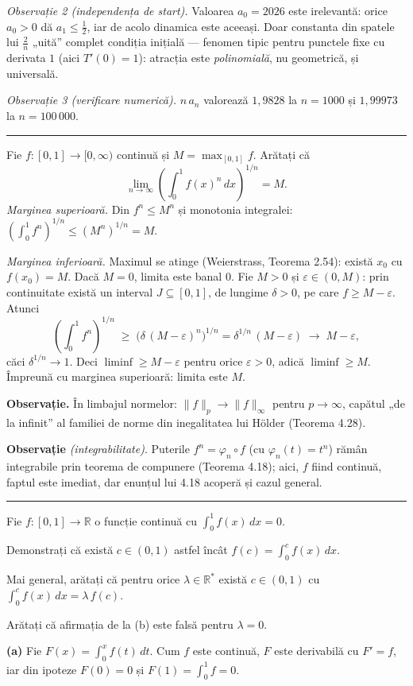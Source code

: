 \emph{Observație 2 (independența de start).} Valoarea $a_{0}=2026$ este irelevantă: orice $a_{0}>0$ dă $a_{1}\le\frac12$, iar de acolo dinamica este aceeași. Doar constanta din spatele lui $\frac2n$ „uită'' complet condiția inițială --- fenomen tipic pentru punctele fixe cu derivata $1$ (aici $T'(0)=1$): atracția este \emph{polinomială}, nu geometrică, și universală.

\emph{Observație 3 (verificare numerică).} $n\,a_{n}$ valorează $1{,}9828$ la $n=1000$ și $1{,}99973$ la $n=100\,000$.
\vspace{1mm}\hrule

Fie $f : [0,1] \to [0,\infty)$ continuă și $M = \max_{[0,1]} f$. Arătați că
\[
\lim_{n\to\infty} \left( \int_0^1 f(x)^n \, dx \right)^{1/n} = M.
\]
\sol \emph{Marginea superioară.} Din $f^n \le M^n$ și monotonia integralei:
$\left(\int_0^1 f^n\right)^{1/n} \le (M^n)^{1/n} = M$.

\emph{Marginea inferioară.} Maximul se atinge (Weierstrass, Teorema 2.54): există
$x_0$ cu $f(x_0) = M$. Dacă $M = 0$, limita este banal $0$. Fie $M > 0$ și
$\varepsilon \in (0, M)$: prin continuitate există un interval $J \subseteq [0,1]$, de lungime $\delta > 0$, pe
care $f \ge M - \varepsilon$. Atunci
\[
\left( \int_0^1 f^n \right)^{1/n} \;\ge\; \bigl( \delta \, (M - \varepsilon)^n \bigr)^{1/n} = \delta^{1/n} \, (M - \varepsilon) \; \longrightarrow \; M - \varepsilon,
\]
căci $\delta^{1/n} \to 1$. Deci $\liminf \ge M - \varepsilon$ pentru orice $\varepsilon > 0$, adică $\liminf \ge M$. Împreună
cu marginea superioară: limita este $M$.

\medskip
\noindent\textbf{Observație.} În limbajul normelor: $\|f\|_p \to \|f\|_\infty$ pentru $p \to \infty$,
capătul „de la infinit'' al familiei de norme din inegalitatea lui H\"older (Teorema 4.28).

\medskip
\noindent\textbf{Observație} \emph{(integrabilitate)}. Puterile $f^n = \varphi_n \circ f$ (cu $\varphi_n(t) = t^n$) rămân
integrabile prin teorema de compunere (Teorema 4.18); aici, $f$ fiind continuă, faptul
este imediat, dar enunțul lui 4.18 acoperă și cazul general.
\vspace{1mm}\hrule

Fie $f:[0,1]\to\mathbb{R}$ o funcție continuă cu $\displaystyle\int_0^1 f(x)\,dx=0$.
\begin{parti}
  \item Demonstrați că există $c\in(0,1)$ astfel încât
        $\displaystyle f(c)=\int_0^c f(x)\,dx$.
  \item Mai general, arătați că pentru orice $\lambda\in\mathbb{R}^{*}$ există
        $c\in(0,1)$ cu $\displaystyle\int_0^c f(x)\,dx=\lambda\,f(c)$.
  \item Arătați că afirmația de la (b) este falsă pentru $\lambda=0$.
\end{parti}
\sol\noindent\textbf{(a)} Fie $F(x)=\int_0^x f(t)\,dt$. Cum $f$ este continuă, $F$ este derivabilă cu
$F'=f$, iar din ipoteze $F(0)=0$ și $F(1)=\int_0^1 f=0$.

